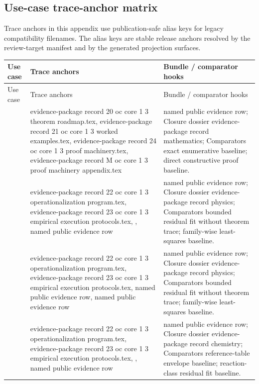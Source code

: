 \begin{longtable}{@{}L{0.13\textwidth}L{0.14\textwidth}L{0.12\textwidth}L{0.18\textwidth}L{0.17\textwidth}L{0.20\textwidth}@{}}
\bottomrule
\end{longtable}

\subsection{Use-case trace-anchor matrix}
Trace anchors in this appendix use publication-safe alias keys for legacy compatibility filenames. The alias keys are stable release anchors resolved by the review-target manifest and by the generated projection surfaces.
\begin{longtable}{@{}L{0.16\textwidth}L{0.38\textwidth}L{0.34\textwidth}@{}}
\toprule
Use case & Trace anchors & Bundle / comparator hooks \\
\midrule
\endfirsthead
\toprule
Use case & Trace anchors & Bundle / comparator hooks \\
\midrule
\endhead
{} & evidence-package record 20 oc core 1 3 theorem roadmap.tex, \allowbreak evidence-package record 21 oc core 1 3 worked examples.tex, \allowbreak evidence-package record 24 oc core 1 3 proof machinery.tex, \allowbreak evidence-package record M oc core 1 3 proof machinery appendix.tex & named public evidence row; Closure dossier evidence-package record mathematics; Comparators exact enumerative baseline; direct constructive proof baseline. \\
 & evidence-package record 22 oc core 1 3 operationalization program.tex, \allowbreak evidence-package record 23 oc core 1 3 empirical execution protocols.tex, \allowbreak {}, named public evidence row & named public evidence row; Closure dossier evidence-package record physics; Comparators bounded residual fit without theorem trace; family-wise least-squares baseline. \\
 & evidence-package record 22 oc core 1 3 operationalization program.tex, \allowbreak evidence-package record 23 oc core 1 3 empirical execution protocols.tex, named public evidence row, named public evidence row & named public evidence row; Closure dossier evidence-package record physics; Comparators bounded residual fit without theorem trace; family-wise least-squares baseline. \\
 & evidence-package record 22 oc core 1 3 operationalization program.tex, \allowbreak evidence-package record 23 oc core 1 3 empirical execution protocols.tex, \allowbreak {}, named public evidence row & named public evidence row; Closure dossier evidence-package record chemistry; Comparators reference-table envelope baseline; reaction-class residual fit baseline. \\

\end{longtable}
